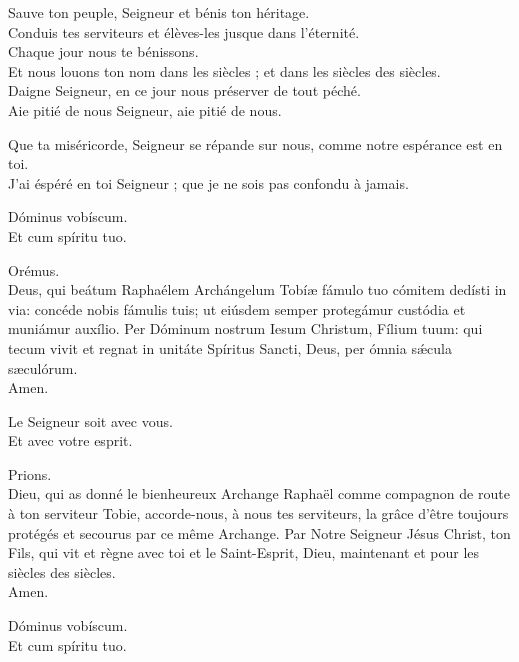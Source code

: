 \documentclass[twoside]{article}
\begin{document}
\begin{paracol}[1]{2}
Sauve ton peuple, Seigneur  et bénis ton héritage.\\
Conduis tes serviteurs et élèves-les jusque dans l'éternité.\\
Chaque jour nous te bénissons.\\
Et nous louons ton nom dans les siècles ; et dans les siècles des siècles.\\

Daigne Seigneur, en ce jour nous préserver de tout péché.\\
Aie pitié de nous Seigneur, aie pitié de nous.\\

\vfill\pagebreak


Que ta miséricorde, Seigneur se répande sur nous, comme notre espérance est en toi.\\
J'ai éspéré en toi Seigneur ; que je ne sois pas confondu à jamais.

\switchcolumn*

\vv Dóminus vobíscum. \\
\rr Et cum spíritu tuo.

Orémus.\\
Deus, qui beátum Raphaélem Archángelum Tobíæ fámulo tuo cómitem dedísti in via: concéde nobis fámulis tuis; ut eiúsdem semper protegámur custódia et muniámur auxílio.
Per Dóminum nostrum Iesum Christum, Fílium tuum: qui tecum vivit et regnat in unitáte Spíritus Sancti, Deus, per ómnia sǽcula sæculórum. \\
\rr Amen.

\switchcolumn

\vv Le Seigneur soit avec vous. \\
\rr Et avec votre esprit.

Prions. \\
Dieu, qui as donné le bienheureux Archange Raphaël comme compagnon de route à ton serviteur Tobie, accorde-nous, à nous tes serviteurs, la grâce d’être toujours protégés et secourus par ce même Archange.
Par Notre Seigneur Jésus Christ, ton Fils, qui vit et règne avec toi et le Saint-Esprit, Dieu, maintenant et pour les siècles des siècles.\\
\rr Amen.

\switchcolumn*

\vv Dóminus vobíscum. \\
\rr Et cum spíritu tuo.

~~


\switchcolumn


\end{paracol}
\end{document}
